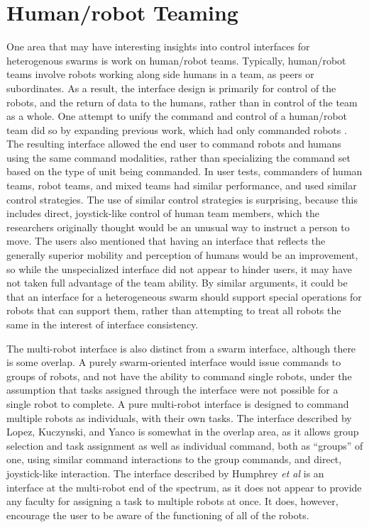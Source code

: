 \section{Human/robot Teaming} \label{section:human_robot_teaming}

One area that may have interesting insights into control interfaces for heterogenous swarms is work on human/robot teams. 
Typically, human/robot teams involve robots working along side humans in a team, as peers or subordinates. 
As a result, the interface design is primarily for control of the robots, and the return of data to the humans, rather than in control of the team as a whole.
One attempt to unify the command and control of a human/robot team did so by expanding previous work, which had only commanded robots \citep{lopez2017unified}. 
The resulting interface allowed the end user to command robots and humans using the same command modalities, rather than specializing the command set based on the type of unit being commanded. 
In user tests, commanders of human teams, robot teams, and mixed teams had similar performance, and used similar control strategies.
The use of similar control strategies is surprising, because this includes direct, joystick-like control of human team members, which the researchers originally thought would be an unusual way to instruct a person to move. 
The users also mentioned that having an interface that reflects the generally superior mobility and perception of humans would be an improvement, so while the unspecialized interface did not appear to hinder users, it may have not taken full advantage of the team ability. 
By similar arguments, it could be that an interface for a heterogeneous swarm should support special operations for robots that can support them, rather than attempting to treat all robots the same in the interest of interface consistency. 

The multi-robot interface is also distinct from a swarm interface, although there is some overlap. 
A purely swarm-oriented interface would issue commands to groups of robots, and not have the ability to command single robots, under the assumption that tasks assigned through the interface were not possible for a single robot to complete. 
A pure multi-robot interface is designed to command multiple robots as individuals, with their own tasks. 
The interface described by Lopez, Kuczynski, and Yanco is somewhat in the overlap area, as it allows group selection and task assignment as well as individual command, both as ``groups'' of one, using similar command interactions to the group commands, and direct, joystick-like interaction. 
The interface described by Humphrey \emph{et al} is an interface at the multi-robot end of the spectrum, as it does not appear to provide any faculty for assigning a task to multiple robots at once.
It does, however, encourage the user to be aware of the functioning of all of the robots. 

